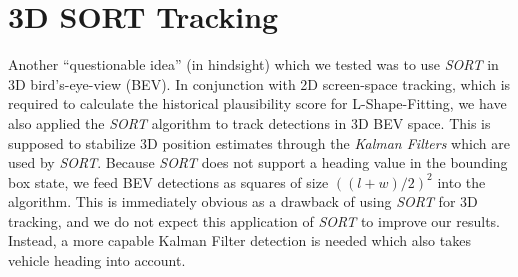 \section{3D SORT Tracking}
\label{sec:trackthreed}

Another \enquote{questionable idea} (in hindsight) which we tested was to use \textit{SORT} in 3D bird's-eye-view (BEV).
In conjunction with 2D screen-space tracking, which is required to calculate the historical plausibility score for L-Shape-Fitting, we have also applied the \textit{SORT} algorithm to track detections in 3D BEV space.
This is supposed to stabilize 3D position estimates through the \textit{Kalman Filters} which are used by \textit{SORT}.
Because \textit{SORT} does not support a heading value in the bounding box state, we feed BEV detections as squares of size $((l+w)/2)^2$ into the algorithm.
This is immediately obvious as a drawback of using \textit{SORT} for 3D tracking, and we do not expect this application of \textit{SORT} to improve our results.
Instead, a more capable Kalman Filter detection is needed which also takes vehicle heading into account.
